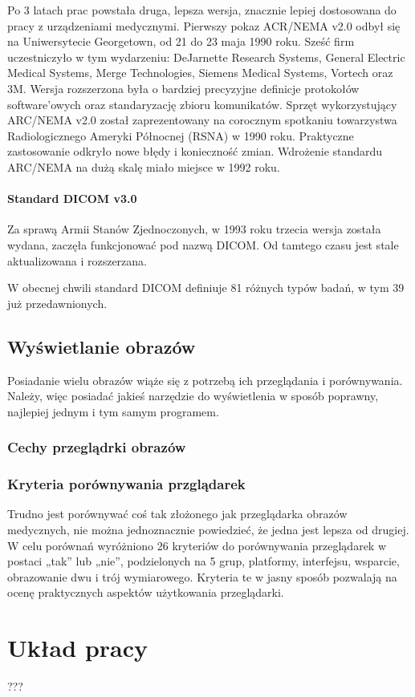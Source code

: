 
Po 3 latach prac powstała druga, lepsza wersja, znacznie lepiej dostosowana do pracy z urządzeniami medycznymi.
Pierwszy pokaz ACR/NEMA v2.0 odbył się na Uniwersytecie Georgetown, od 21 do 23 maja 1990 roku.
Sześć firm uczestniczyło w tym wydarzeniu: DeJarnette Research Systems, General Electric Medical Systems, Merge Technologies, Siemens Medical Systems, Vortech oraz 3M. 
Wersja rozszerzona była o bardziej precyzyjne definicje protokołów software’owych oraz standaryzację zbioru komunikatów.
Sprzęt wykorzystujący ARC/NEMA v2.0 został zaprezentowany na corocznym spotkaniu towarzystwa Radiologicznego Ameryki Północnej (RSNA) w 1990 roku.
Praktyczne zastosowanie odkryło nowe błędy i konieczność zmian.
Wdrożenie standardu ARC/NEMA na dużą skalę miało miejsce w 1992 roku.

\paragraph{Standard DICOM v3.0}

Za sprawą Armii Stanów Zjednoczonych, w 1993 roku trzecia wersja została wydana, zaczęła funkcjonować pod nazwą DICOM.
Od tamtego czasu jest stale aktualizowana i rozszerzana.

W obecnej chwili standard DICOM definiuje 81 różnych typów badań, w tym 39 już przedawnionych.

\subsection{Wyświetlanie obrazów}

Posiadanie wielu obrazów wiąże się z potrzebą ich przeglądania i porównywania.
Należy, więc posiadać jakieś narzędzie do wyświetlenia w sposób poprawny, najlepiej jednym i tym samym programem.


\subsubsection{Cechy przeglądrki obrazów}

\subsubsection{Kryteria porównywania przglądarek}

Trudno jest porównywać coś tak złożonego jak przeglądarka obrazów medycznych, nie można jednoznacznie powiedzieć, że jedna jest lepsza od drugiej.
W celu porównań wyróżniono 26 kryteriów do porównywania przeglądarek w postaci „tak” lub „nie”, podzielonych na 5 grup, platformy, interfejsu, wsparcie, obrazowanie dwu i trój wymiarowego.
Kryteria te w jasny sposób pozwalają na ocenę praktycznych aspektów użytkowania przeglądarki.

\section{Układ pracy}

???